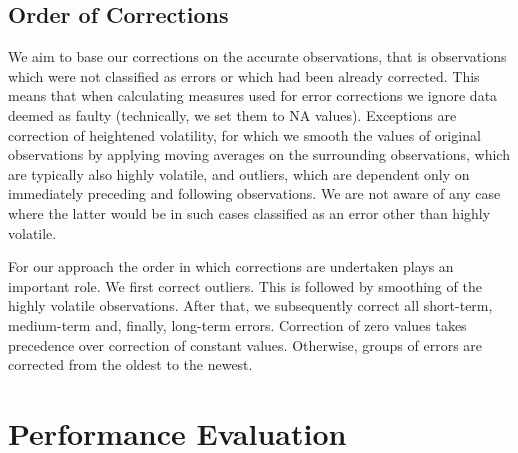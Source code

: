 \documentclass[12pt,a4paper]{article}
\begin{document}
\subsection{Order of Corrections}

We aim to base our corrections on the accurate observations, that is observations which were not classified as errors or which had been already corrected. This means that when calculating measures used for error corrections we ignore data deemed as faulty (technically, we set them to NA values). Exceptions are correction of heightened volatility, for which we smooth the values of original observations by applying moving averages on the surrounding observations, which are typically also highly volatile, and outliers, which are dependent only on immediately preceding and following observations. We are not aware of any case where the latter would be in such cases classified as an error other than highly volatile.

For our approach the order in which corrections are undertaken plays an important role. We first correct outliers. This is followed by smoothing of the highly volatile observations. After that, we subsequently correct all short-term, medium-term and, finally, long-term errors. Correction of zero values takes precedence over correction of constant values. Otherwise, groups of errors are corrected from the oldest to the newest.  




\newpage
\section{Performance Evaluation}
\end{document}
